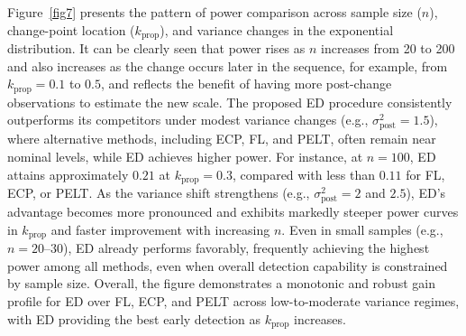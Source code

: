 \documentclass[11pt]{article}
\numberwithin{theorem}{section}
\numberwithin{Lemma}{section}
\numberwithin{Definition}{section}
\begin{document}
Figure~\ref{fig7} presents the pattern of power comparison across sample size ($n$), change-point location ($k_{\text{prop}}$), and variance changes in the exponential distribution. It can be clearly seen that power rises as $n$ increases from 20 to 200 and also increases as the change occurs later in the sequence, for example, from $k_{\text{prop}}{=}0.1$ to $0.5$, and reflects the benefit of having more post-change observations to estimate the new scale. The proposed ED procedure consistently outperforms its competitors under modest variance changes (e.g., $\sigma^2_{\text{post}}=1.5$), where alternative methods, including ECP, FL, and PELT, often remain near nominal levels, while ED achieves higher power. For instance, at $n{=}100$, ED attains approximately $0.21$ at $k_{\text{prop}}{=}0.3$, compared with less than $0.11$ for FL, ECP, or PELT. As the variance shift strengthens (e.g., $\sigma^2_{\text{post}}=2$ and $2.5$), ED’s advantage becomes more pronounced and exhibits markedly steeper power curves in $k_{\text{prop}}$ and faster improvement with increasing $n$. Even in small samples (e.g., $n{=}20$–$30$), ED already performs favorably, frequently achieving the highest power among all methods, even when overall detection capability is constrained by sample size. Overall, the figure demonstrates a monotonic and robust gain profile for ED over FL, ECP, and PELT across low-to-moderate variance regimes, with ED providing the best early detection as $k_{\text{prop}}$ increases.\\
\end{document}
